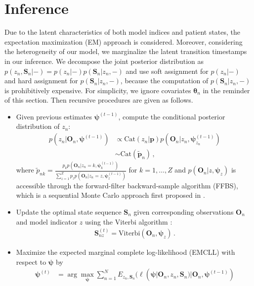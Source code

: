 \documentclass{article}
\begin{document}
\section{Inference}
Due to the latent characteristics of both model indices and patient states, the expectation maximization (EM) approach is considered. Moreover, considering the heterogeneity of our model, we marginalize the latent transition timestamps in our inference. We decompose the joint posterior distribution as $p(z_n, \bm S_n| -) = p(z_n| - )p(\bm S_n| z_n, -)$ and use soft assignment for $p(z_n| -)$ and hard assignment for $p(\bm S_n| z_n, -)$, because the computation of $p(\bm S_n|z_n, -)$ is prohibitively expensive. For simplicity, we ignore covariates $\bm{\theta}_n$ in the reminder of this section. Then recursive procedures are given as follows.
\begin{itemize}
	\item Given previous estimates $\bm \psi^{(t-1)}$, compute the conditional posterior distribution of $z_n$:
	\begin{align}
	p(z_n|\bm O_n, \bm \psi^{(t-1)}) & \propto \mathrm{Cat}(z_n|\bm p)p(\bm O_n| z_n, \bm\psi^{(t-1)}_{z_n}) \nonumber \\
	& \sim \mathrm{Cat}(\tilde{\bm p}_n)\,,
	\label{Pos_I}
	\end{align}
	where $\tilde{p}_{nk} = \frac{p_k p(\bm O_n| z_n = k, \bm{\psi}^{(t-1)}_k)}{\sum_{z = 1}^{Z}p_z p(\bm O_n | z_n = z, \bm\psi^{(t-1)}_z)}$ for $k = 1, \ldots, Z$ and $p(\bm O_n | z, \bm \psi_{z})$ is accessible through the forward-filter backward-sample algorithm (FFBS), which is a sequential Monte Carlo approach first proposed in \cite{Kitagawa_1987}.
	\item Update the optimal state sequence $\bm S_n$ given corresponding observations $\bm O_n$ and model indicator $z$ using the Viterbi algorithm \citep{Forney_1973}: 
	\begin{align}
	\bm S^{(t)}_{nz} = \mathrm{Viterbi}(\bm O_n, \bm \psi_z)\,.
	\label{Pos_S}
	\end{align}
	\item Maximize the expected marginal complete log-likelihood (EMCLL) with respect to $\bm \psi$ by
	\begin{align}
	\bm \psi^{(t)} & = \arg\max\limits_{\bm{\psi}}\sum_{n=1}^{N}E_{z_n, \bm S_n}(\ell(\bm \psi| \bm O_n, z_n, \bm S_n)| \bm O_n, \bm \psi^{(t-1)}) \nonumber \\ 

\end{align}
\end{itemize}
\end{document}
